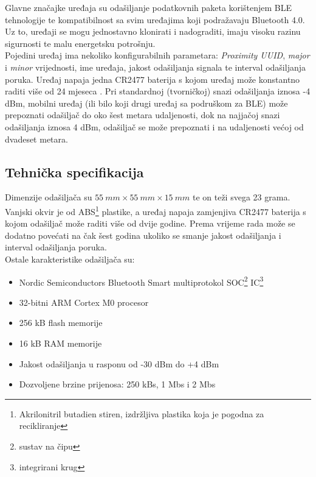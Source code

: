 Glavne značajke uređaja su odašiljanje podatkovnih paketa korištenjem BLE tehnologije te kompatibilnost sa svim uređajima koji podražavaju Bluetooth 4.0. 
Uz to, uređaji se mogu jednostavno klonirati i nadograditi, imaju visoku razinu sigurnosti te malu energetsku potrošnju.
\\
Pojedini uređaj ima nekoliko konfigurabilnih parametara: \textit{Proximity UUID}, \textit{major} i \textit{minor} vrijednosti, ime uređaja, jakost odašiljanja signala te interval odašiljanja poruka.
Uređaj napaja jedna CR2477 baterija s kojom uređaj može konstantno raditi više od 24 mjeseca \citep{kontaktDatasheet}.  
Pri standardnoj (tvorničkoj) snazi odašiljanja iznosa -4 dBm, mobilni uređaj (ili bilo koji drugi uređaj sa podruškom za BLE) može prepoznati odašiljač do oko šest metara udaljenosti, dok na najjačoj snazi odašiljanja iznosa 4 dBm, odašiljač se može prepoznati i na udaljenosti većoj od dvadeset metara.

\subsection{Tehnička specifikacija}

Dimenzije odašiljača su $\SI{55}{mm} \times \SI{55}{mm} \times \SI{15}{mm}$ te on teži svega 23 grama. 
Vanjski okvir je od ABS\footnote{Akrilonitril butadien stiren, izdržljiva plastika koja je pogodna za recikliranje} plastike, a uređaj napaja zamjenjiva CR2477 baterija s kojom odašiljač može raditi više od dvije godine. 
Prema \citep{kontaktTehnical} vrijeme rada može se dodatno povećati na čak šest godina ukoliko se smanje jakost odašiljanja i interval odašiljanja poruka.
\\
Ostale karakteristike odašiljača su:

\begin{itemize}
    \item Nordic Semiconductors Bluetooth Smart multiprotokol SOC\footnote{sustav na čipu } IC\footnote{integrirani krug }
    \item 32-bitni ARM Cortex M0 procesor
    \item 256 kB flash memorije
    \item 16 kB RAM memorije
    \item Jakost odašiljanja u rasponu od -30 dBm do +4 dBm 
    \item Dozvoljene brzine prijenosa: 250 kBs, 1 Mbs i 2 Mbs
\end{itemize}

